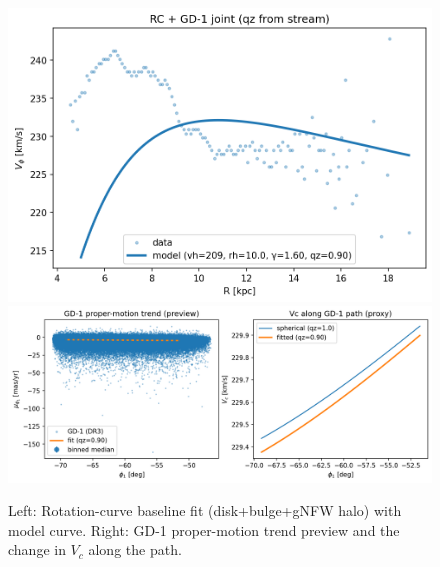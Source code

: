 
\begin{figure}[t]
\centering
\includegraphics[width=.62\textwidth]{results/joint_rc_fit.png}\hfill
\includegraphics[width=.36\textwidth]{results/joint_stream_fit.png}
\caption{Left: Rotation-curve baseline fit (disk+bulge+gNFW halo) with model curve.
Right: GD-1 proper-motion trend preview and the change in $V_c$ along the path.}
\end{figure}
